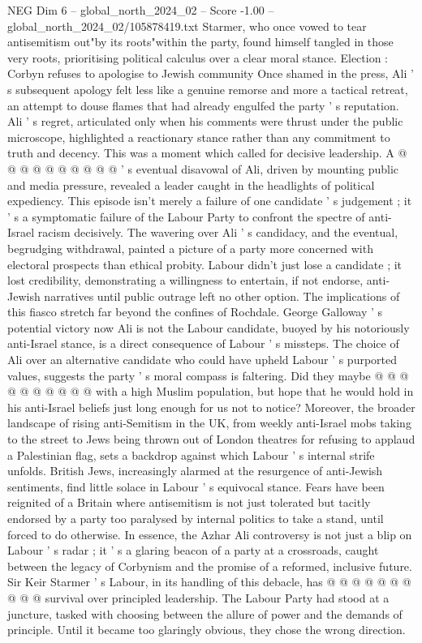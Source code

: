 \begin{textsample}{NEG Dim 6 – global\_north\_2024\_02 – Score -1.00 – global\_north\_2024\_02/105878419.txt}
Starmer, who once vowed to tear antisemitism out"by its roots"within the party, found himself tangled in those very roots, prioritising political calculus over a clear moral stance.
Election : Corbyn refuses to apologise to Jewish community Once shamed in the press, Ali ' s subsequent apology felt less like a genuine remorse and more a tactical retreat, an attempt to douse flames that had already engulfed the party ' s reputation.
Ali ' s regret, articulated only when his comments were thrust under the public microscope, highlighted a reactionary stance rather than any commitment to truth and decency.
This was a moment which called for decisive leadership.
A @ @ @ @ @ @ @ @ @ @ ' s eventual disavowal of Ali, driven by mounting public and media pressure, revealed a leader caught in the headlights of political expediency.
This episode isn't merely a failure of one candidate ' s judgement ; it ' s a symptomatic failure of the Labour Party to confront the spectre of anti-Israel racism decisively.
The wavering over Ali ' s candidacy, and the eventual, begrudging withdrawal, painted a picture of a party more concerned with electoral prospects than ethical probity.
Labour didn't just lose a candidate ; it lost credibility, demonstrating a willingness to entertain, if not endorse, anti-Jewish narratives until public outrage left no other option.
The implications of this fiasco stretch far beyond the confines of Rochdale.
George Galloway ' s potential victory now Ali is not the Labour candidate, buoyed by his notoriously anti-Israel stance, is a direct consequence of Labour ' s missteps.
The choice of Ali over an alternative candidate who could have upheld Labour ' s purported values, suggests the party ' s moral compass is faltering.
Did they maybe @ @ @ @ @ @ @ @ @ @ with a high Muslim population, but hope that he would hold in his anti-Israel beliefs just long enough for us not to notice?
Moreover, the broader landscape of rising anti-Semitism in the UK, from weekly anti-Israel mobs taking to the street to Jews being thrown out of London theatres for refusing to applaud a Palestinian flag, sets a backdrop against which Labour ' s internal strife unfolds.
British Jews, increasingly alarmed at the resurgence of anti-Jewish sentiments, find little solace in Labour ' s equivocal stance.
Fears have been reignited of a Britain where antisemitism is not just tolerated but tacitly endorsed by a party too paralysed by internal politics to take a stand, until forced to do otherwise.
In essence, the Azhar Ali controversy is not just a blip on Labour ' s radar ; it ' s a glaring beacon of a party at a crossroads, caught between the legacy of Corbynism and the promise of a reformed, inclusive future.
Sir Keir Starmer ' s Labour, in its handling of this debacle, has @ @ @ @ @ @ @ @ @ @ survival over principled leadership.
The Labour Party had stood at a juncture, tasked with choosing between the allure of power and the demands of principle.
Until it became too glaringly obvious, they chose the wrong direction.

\end{textsample}
